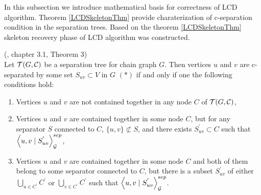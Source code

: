 %
%

In this subsection we introduce mathematical basis for correctness of LCD algorithm.
Theorem \ref{LCDSkeletonThm} provide charaterization of c-separation condition in the separation trees. 
Based on the theorem \ref{LCDSkeletonThm} skeleton recovery phase of LCD algorithm was constructed. 

\begin{thm} \label{LCDSkeletonThm} (\cite{CG}, chapter 3.1, Theorem 3) \\ 
	Let $\mathcal{T}(G, \mathcal{C})$ be a separation tree for chain graph $G$. Then vertices $u$ and $v$ are 
	c-separated by some set $S_{uv} \subset V$ in $G$ $(*)$ if and only if one the following conditions hold:
	
	\begin{enumerate}
		\item Vertices $u$ and $v$ are not contained together in any node $C$ of $\mathcal{T}(G, \mathcal{C})$,
		
		\item Vertices $u$ and $v$ are contained together in some node $C$, but for any separator $S$ connected
		to $C$, $\{u, v \} \not \subset S$, and there exists $S_{uv}^{'} \subset C$ such 
		that $\left\langle u , v \mid S_{uv}^{'} \right\rangle_{\mathcal{G}}^{sep}$,
		
		\item Vertices $u$ and $v$ are contained together in some node $C$ and both of them belong to some separator
		connected to $C$, but there is a subset $S_{uv}^{'}$ of either $\bigcup_{u \in C^{'}} C^{'}$ or
		$\bigcup_{v \in C^{'}} C^{'}$ such that $\left\langle u , v \mid S_{uv}^{'} \right\rangle_{\mathcal{G}}^{sep}$.
	\end{enumerate}
\end{thm}

